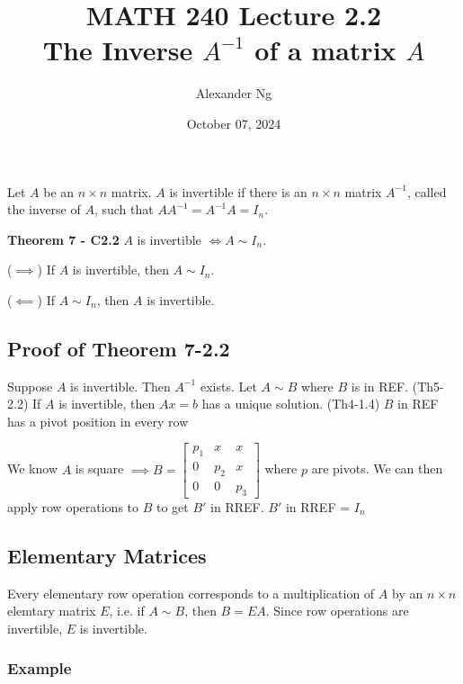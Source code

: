 \documentclass[12pt]{article}
\begin{document}
\renewcommand{\arraystretch}{1.25} %
\setlength{\arraycolsep}{12pt} 

\title{MATH 240 Lecture 2.2\\The Inverse $A^{-1}$ of a matrix $A$}
\author{Alexander Ng}
\date{October 07, 2024}

\maketitle

Let $A$ be an $n \times n$ matrix. $A$ is invertible if there is an $n \times n$
matrix $A^{-1}$, called the inverse of $A$, such that $AA^{-1} = A^{-1}A = I_n$.

\textbf{Theorem 7 - C2.2} $A$ is invertible $\iff A \sim I_n$.

($\implies$) If $A$ is invertible, then $A \sim I_n$.

($\impliedby$) If $A \sim I_n$, then $A$ is invertible.

\subsection*{Proof of Theorem 7-2.2}

Suppose $A$ is invertible. Then $A^{-1}$ exists. Let $A \sim B$ where $B$ is
in REF.
\indent (Th5-2.2) If $A$ is invertible, then $Ax=b$ has a unique solution.
\indent (Th4-1.4) $B$ in REF has a pivot position in every row

We know $A$ is square $\implies B = \begin{bmatrix}p_1 & x & x \\ 0 & p_2 & x \\ 0 & 0 & p_3 \end{bmatrix}$
where $p$ are pivots. We can then apply row operations to $B$ to get $B'$ in RREF. 
$B'$ in RREF = $I_n$

\subsection*{Elementary Matrices}
Every elementary row operation corresponds to a multiplication of $A$ by an 
$n \times n$ elemtary matrix $E$, i.e. if $A \sim B$, then $B = EA$. Since row 
operations are invertible, $E$ is invertible.

\subsubsection*{Example}
\end{document}

